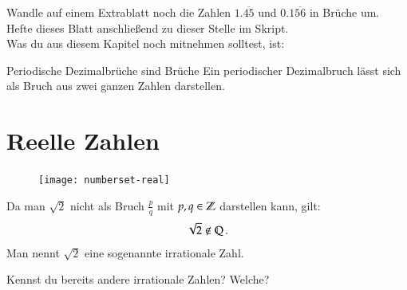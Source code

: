 Wandle auf einem Extrablatt noch die Zahlen $1.\overline{45}$ und $0.1\overline{56}$ in Brüche um.
Hefte dieses Blatt anschließend zu dieser Stelle im Skript.\\
Was du aus diesem Kapitel noch mitnehmen solltest, ist:

\begin{law}{Periodische Dezimalbrüche sind Brüche}
	\label{law:periodicIsRational}
	Ein periodischer Dezimalbruch lässt sich als Bruch aus zwei ganzen Zahlen darstellen.
\end{law}

\section{Reelle Zahlen}
\begin{figure}
	\vspace{-1cm}
	\texttt{[image: numberset-real]}
	\vspace{-1cm}
\end{figure}
Da man $\sqrt{2}$ nicht als Bruch $\frac{p}{q}$ mit $p,q\in\mathbb{Z}$ darstellen kann, gilt:
\begin{align*}
  \sqrt{2} \notin \mathbb{Q}\, .
\end{align*}
Man nennt $\sqrt{2}$ eine sogenannte irrationale Zahl.
\begin{example}
 Kennst du bereits andere irrationale Zahlen? Welche?\\
\end{example}
